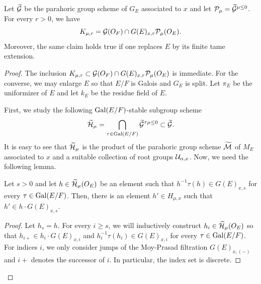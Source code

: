 \documentclass[12pt,reqno]{amsart}
\begin{document}

\begin{prop} \label{prop:characterize_Kr}
    Let ${\widetilde{{\mathcal{G}}}}$ be the parahoric group scheme of $G_E$ associated to $x$ and let ${\mathcal{P}}_\mu = {\widetilde{{\mathcal{G}}}}^{\mu \leq 0}$. For every $r  > 0$, we have 
    \[
        K_{\mu, r} = {\mathcal{G}}(O_F) \cap G(E)_{x, r} {\mathcal{P}}_{\mu}(O_{E}). 
    \]
    Moreover, the same claim holds true if one replaces $E$ by its finite tame extension. 
\end{prop}
\begin{proof}
    The inclusion $K_{\mu, r} \subset {\mathcal{G}}(O_F) \cap G(E)_{x, r} {\mathcal{P}}_{\mu}(O_{E})$ is immediate. For the converse, we may enlarge $E$ so that $E / F$ is Galois and $G_E$ is split. Let $\pi_E$ be the uniformizer of $E$ and let $k_E$ be the residue field of $E$. 

    First, we study the following ${\operatorname{Gal}}(E / F)$-stable subgroup scheme
    \[
        {\widetilde{{\mathcal{H}}}}_\mu = \bigcap_{\tau \in {\operatorname{Gal}}(E / F)} {\widetilde{{\mathcal{G}}}}^{\tau\mu \leq 0} \subset {\widetilde{{\mathcal{G}}}}. 
    \]  
    It is easy to see that ${\widetilde{{\mathcal{H}}}}_\mu$ is the product of the parahoric group scheme ${\widetilde{{\mathcal{M}}}}$ of $M_E$ associated to $x$ and a suitable collection of root groups ${\mathcal{U}}_{\alpha, x}$. Now, we need the following lemma. 

\begin{lem} \label{lem:modify_h}
    Let $s > 0$ and let $h \in {\widetilde{{\mathcal{H}}}}_\mu(O_E)$ be an element such that $h^{-1} \tau(h) \in G(E)_{x, s}$ for every $\tau \in {\operatorname{Gal}}(E / F)$. Then, there is an element $h' \in H_{\mu, x}$ such that $h' \in h \cdot G(E)_{x, s}$. 
\end{lem}
\begin{proof}
    Let $h_s = h$. For every $i \geq s$, we will inductively construct $h_i \in {\widetilde{{\mathcal{H}}}}_\mu(O_E)$ so that $h_{i+} \in  h_{i} \cdot G(E)_{x, i}$ and $h_i^{-1} \tau(h_i) \in G(E)_{x, i}$ for every $\tau \in {\operatorname{Gal}}(E / F)$. For indices $i$, we only consider jumps of the Moy-Prasad filtration $G(E)_{x, (-)}$ and $i+$ denotes the successor of $i$. In particular, the index set is discrete.  
    

\end{proof}
\end{proof}
\end{document}

